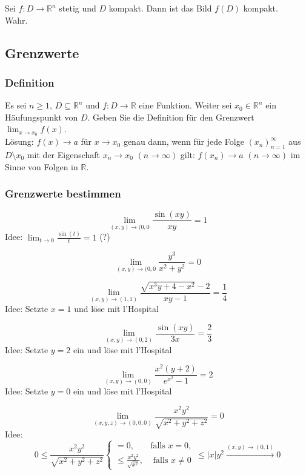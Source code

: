\documentclass[parskip=full]{scrartcl}
\begin{document}
Sei $f:D \to \mathbb{R}^n$ stetig und $D$ kompakt.
Dann ist das Bild $f(D)$ kompakt.\\
Wahr.

\subsection{Grenzwerte}
\subsubsection{Definition}
Es sei $n \geq 1$, $D \subseteq \mathbb{R}^n$ und $f : D \to \mathbb{R}$ eine Funktion.
Weiter sei $x_0 \in \mathbb{R}^n$ ein Häufungspunkt von $D$.
Geben Sie die Definition für den Grenzwert $\lim_{x \to x_0} f(x)$.\\
Lösung:
$f(x) \to a$ für $x \to x_0$ genau dann, wenn für jede Folge $(x_n)_{n = 1}^{\infty}$ aus $D \setminus x_0$ mit der Eigenschaft $x_n \to x_0$ $(n \to \infty)$ gilt:
$f(x_n) \to a$ $(n \to \infty)$ im Sinne von Folgen in $\mathbb{R}$.

\subsubsection{Grenzwerte bestimmen}
\begin{displaymath}
  \lim_{(x,y) \to (0,0} \frac{\sin(xy)}{xy} = 1
\end{displaymath}
Idee: $\lim_{t \to 0} \frac{\sin(t)}{t} = 1$ (?)

\begin{displaymath}
  \lim_{(x,y) \to (0,0} \frac{y^3}{x^2 + y^2} = 0
\end{displaymath}

\begin{displaymath}
  \lim_{(x,y) \to (1,1)} \frac{\sqrt{x^3y + 4 - x^2} - 2}{xy - 1} = \frac{1}{4}
\end{displaymath}
Idee: Setzte $x = 1$ und löse mit l'Hospital

\begin{displaymath}
  \lim_{(x,y) \to (0,2)} \frac{\sin(xy)}{3x} = \frac{2}{3}
\end{displaymath}
Idee: Setzte $y = 2$ ein und löse mit l'Hospital

\begin{displaymath}
  \lim_{(x,y) \to (0,0)} \frac{x^2(y + 2)}{e^{x^2} - 1} = 2
\end{displaymath}
Idee: Setzte $y = 0$ ein und löse mit l'Hospital

\begin{displaymath}
  \lim_{(x,y,z) \to (0,0,0)} \frac{x^2 y^2}{\sqrt{x^2 + y^2 + z^2}} = 0
\end{displaymath}
Idee:
\begin{displaymath}
  0 \leq \frac{x^2 y^2}{\sqrt{x^2 + y^2 + z^2}}
  \begin{cases}
    = 0,& \text{falls } x = 0,\\
    \leq \frac{x^2 y^2}{\sqrt{x^2}},& \text{ falls } x \neq 0
  \end{cases}
  \leq |x|y^2 \xrightarrow{(x,y) \to (0,1)} 0
\end{displaymath}
\end{document}

